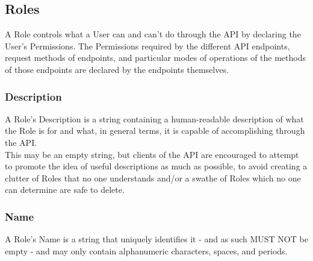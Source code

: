 %
%

\subsection{Roles\label{sec:roles-and-perms}}
A Role controls what a User can and can't do through the API by declaring the
User's Permissions. The Permissions required by the different API endpoints,
request methods of endpoints, and particular modes of operations of the methods
of those endpoints are declared by the endpoints themselves.

\subsubsection{Description}
A Role's Description is a string containing a human-readable description of
what the Role is for and what, in general terms, it is capable of accomplishing
through the API.\\
This may be an empty string, but clients of the API are encouraged to attempt
to promote the idea of useful descriptions as much as possible, to avoid
creating a clutter of Roles that no one understands and/or a swathe of Roles
which no one can determine are safe to delete.

\subsubsection{Name}
A Role's Name is a string that uniquely identifies it - and as such MUST NOT be
empty - and may only contain alphanumeric characters, spaces, and periods.

